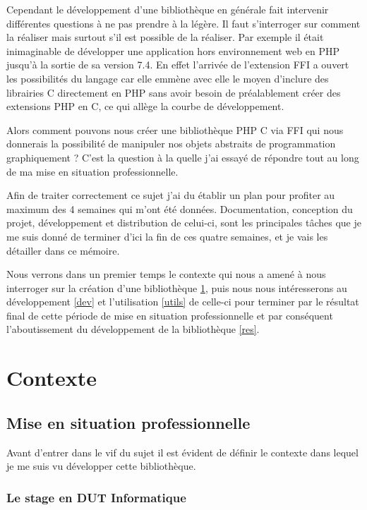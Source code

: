 \documentclass[11pt,a4paper,krantz2,11pt,oneside]{krantz}
\begin{document}
Cependant le développement d'une bibliothèque en générale fait intervenir différentes questions à ne pas prendre à la légère. Il faut s'interroger sur comment la réaliser mais surtout s'il est possible de la réaliser. Par exemple il était inimaginable de développer une application hors environnement web en PHP jusqu'à la sortie de sa version 7.4. En effet l'arrivée de l'extension FFI a ouvert les possibilités du langage car elle emmène avec elle le moyen d'inclure des librairies C directement en PHP sans avoir besoin de préalablement créer des extensions PHP en C, ce qui allège la courbe de développement.

Alors comment pouvons nous créer une bibliothèque PHP C via FFI qui nous donnerais la possibilité de manipuler nos objets abstraits de programmation graphiquement ? C'est la question à la quelle j'ai essayé de répondre tout au long de ma mise en situation professionnelle.

Afin de traiter correctement ce sujet j'ai du établir un plan pour profiter au maximum des 4 semaines qui m'ont été données. Documentation, conception du projet, développement et distribution de celui-ci, sont les principales tâches que je me suis donné de terminer d'ici la fin de ces quatre semaines, et je vais les détailler dans ce mémoire.

Nous verrons dans un premier temps le contexte qui nous a amené à nous interroger sur la création d'une bibliothèque \ref{context}, puis nous nous intéresserons au développement \ref{dev} et l'utilisation \ref{utils} de celle-ci pour terminer par le résultat final de cette période de mise en situation professionnelle et par conséquent l'aboutissement du développement de la bibliothèque \ref{res}.

\hypertarget{context}{%
\chapter{Contexte}\label{context}}

\hypertarget{mise-en-situation-professionnelle}{%
\section{Mise en situation professionnelle}\label{mise-en-situation-professionnelle}}

Avant d'entrer dans le vif du sujet il est évident de définir le contexte dans lequel je me suis vu développer cette bibliothèque.

\hypertarget{le-stage-en-dut-informatique}{%
\subsection{Le stage en DUT Informatique}\label{le-stage-en-dut-informatique}}
\end{document}
